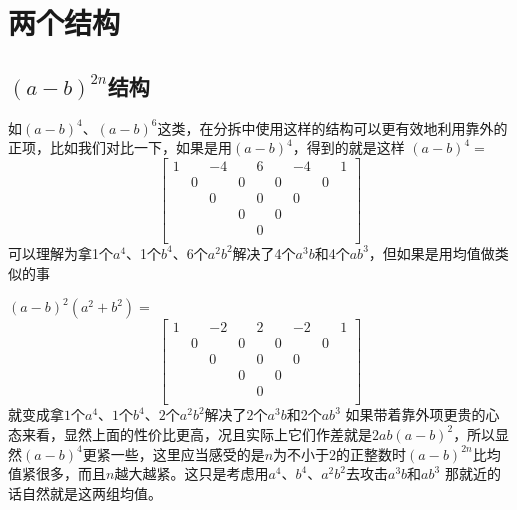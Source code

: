 \documentclass[UTF8]{ctexart}
\begin{document}
\section{两个结构}
\subsection{$ (a-b)^{2n}$结构}
如$ (a-b)^{4} $、$ (a-b)^{6} $这类，在分拆中使用这样的结构可以更有效地利用靠外的正项，比如我们对比一下，如果是用$ (a-b)^{4} $，得到的就是这样
$ (a-b)^{4}= $
\renewcommand*{\arraystretch}{1.732}\[\left[\begin{matrix}
	1& &-4& &6& &-4& &1\\
	&0& &0& &0& &0&\\
	& &0& &0& &0& &\\
	& & &0& &0& & &\\
	& & & &0& & & &\\
\end{matrix}\right]\]
可以理解为拿1个$ a^{4} $、1个$ b^{4} $、6个$ a^{2}b^{2} $解决了4个$ a^{3}b $和4个$ ab^{3} $，但如果是用均值做类似的事

$ (a-b)^{2}(a^{2}+b^{2})= $
\renewcommand*{\arraystretch}{1.732}\[\left[\begin{matrix}
	1& &-2& &2& &-2& &1\\
	&0& &0& &0& &0&\\
	& &0& &0& &0& &\\
	& & &0& &0& & &\\
	& & & &0& & & &\\
\end{matrix}\right]\]
就变成拿$ 1 $个$ a^{4} $、$ 1 $个$ b^{4} $、$ 2 $个$ a^{2}b^{2} $解决了$ 2 $个$ a^{3}b $和2个$ ab^{3} $
如果带着靠外项更贵的心态来看，显然上面的性价比更高，况且实际上它们作差就是$ 2ab(a-b)^{2} $，所以显然$ (a-b)^{4} $更紧一些，这里应当感受的是$ n $为不小于$ 2 $的正整数时$ (a-b)^{2n} $比均值紧很多，而且$ n $越大越紧。这只是考虑用$ a^{4} $、$ b^{4} $、$ a^{2}b^{2} $去攻击$ a^{3}b $和$ ab^{3} $
那就近的话自然就是这两组均值。\\
\end{document}
